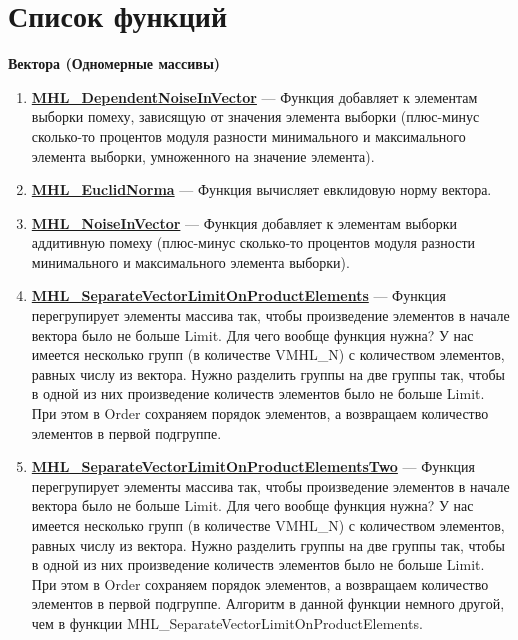 \documentclass[a4paper,12pt]{article}
\begin{document}
\section{Список функций}\label{section_listfunctions}
\textbf{Вектора (Одномерные массивы)}
\begin{enumerate}

\item \textbf{\hyperref[MHL_DependentNoiseInVector]{MHL\_DependentNoiseInVector}} --- Функция добавляет к элементам выборки помеху, зависящую от значения элемента выборки (плюс-минус сколько-то процентов модуля разности минимального и максимального элемента выборки, умноженного на значение элемента).

\item \textbf{\hyperref[MHL_EuclidNorma]{MHL\_EuclidNorma}} --- Функция вычисляет евклидовую норму вектора.

\item \textbf{\hyperref[MHL_NoiseInVector]{MHL\_NoiseInVector}} --- Функция добавляет к элементам выборки аддитивную помеху (плюс-минус сколько-то процентов модуля разности минимального и максимального элемента выборки).

\item \textbf{\hyperref[MHL_SeparateVectorLimitOnProductElements]{MHL\_SeparateVectorLimitOnProductElements}} --- Функция перегрупирует элементы массива так, чтобы произведение элементов в начале вектора было не больше Limit. Для чего вообще функция нужна? У нас имеется несколько групп (в количестве VMHL\_N) с количеством элементов, равных числу из вектора. Нужно разделить группы на две группы так, чтобы в одной из них произведение количеств элементов было не больше Limit. При этом в Order сохраняем порядок элементов, а возвращаем количество элементов в первой подгруппе.

\item \textbf{\hyperref[MHL_SeparateVectorLimitOnProductElementsTwo]{MHL\_SeparateVectorLimitOnProductElementsTwo}} --- Функция перегрупирует элементы массива так, чтобы произведение элементов в начале вектора было не больше Limit. Для чего вообще функция нужна? У нас имеется несколько групп (в количестве VMHL\_N) с количеством элементов, равных числу из вектора. Нужно разделить группы на две группы так, чтобы в одной из них произведение количеств элементов было не больше Limit. При этом в Order сохраняем порядок элементов, а возвращаем количество элементов в первой подгруппе. Алгоритм в данной функции немного другой, чем в функции MHL\_SeparateVectorLimitOnProductElements.


\end{enumerate}
\end{document}
